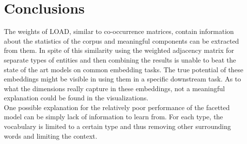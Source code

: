 \chapter{Conclusions}\label{chap:concl}
The weights of LOAD, similar to co-occurrence matrices, contain information about the statistics of the corpus and meaningful components can be extracted from them. In spite of this similarity using the weighted adjacency matrix for separate types of entities and then combining the results is unable to beat the state of the art models on common embedding tasks. The true potential of these embeddings might be visible in using them in a specific downstream task. As to what the dimensions really capture in these embeddings, not a meaningful explanation could be found in the visualizations. \\
One possible explanation for the relatively poor performance of the facetted model can be simply lack of information to learn from. For each type, the vocabulary is limited to a certain type and thus removing other surrounding words and limiting the context. \\

